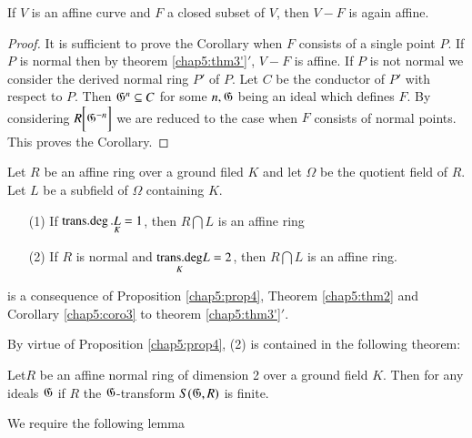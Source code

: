\begin{corollary}\label{chap5:coro3}%
  If $V$ is an affine curve and $F$ a closed subset of $V$, then $V-F$
  is again affine. 
\end{corollary}    


\begin{proof}
  It is sufficient to prove the Corollary when $F$ consists of a
  single point $P$. If $P$ is normal then by theorem
  \ref{chap5:thm3'}$' $, $V-F$ is
  affine. If $P$ is not normal we consider the derived normal ring
  $P'$ of $P$. Let $C$ be the conductor of $P'$ with respect to
  $P$. Then $\mathfrak{G}^n \subseteq C$ for some $n,
  \mathfrak{G}$ being an ideal which defines $F$. By considering $R
  \bigg [\mathfrak{G}^{-n} \bigg ]$ we are reduced to the case when $F$
  consists of normal points. This proves the Corollary. 
\end{proof}     

\medskip
{}

\begin{thm}[Zariski's]\label{chap5:thm4}%
  Let $R$ be an affine ring over a ground filed $K$ and let $\Omega$
  be the quotient field of $R$. Let $L$ be a subfield of $\Omega$
  containing  $K$. 
\begin{itemize}
\item[{\rm (1)}] If $\operatorname{trans{.}deg}. \underset{K}{L}=1$, then $R \bigcap L$
  is an affine ring 

\item[{\rm (2)}] If $R$ is normal and $\underset{K}{\operatorname{trans{.}deg}} L=2 $,
  then $R \bigcap L$ is an affine ring.  
\end{itemize}
\end{thm}


\medskip
{} is a consequence of Proposition
\ref{chap5:prop4}, 
Theorem \ref{chap5:thm2} and Corollary \ref{chap5:coro3} to theorem
\ref{chap5:thm3'}$'$.  
 
\medskip 
{} By virtue of Proposition
\ref{chap5:prop4}, (2) 
is contained in the following theorem: 
    
\begin{dashthm}\label{chap5:thm4'}%
  Let\pageoriginale $R$ be an affine normal ring of dimension 2 over a
  ground field $K$. Then  for any ideals $\mathfrak{G}$ if $R$ the
  $\mathfrak{G}$-transform $S (\mathfrak{G}, R)$ is finite.      
\end{dashthm}
     
We require the following lemma

